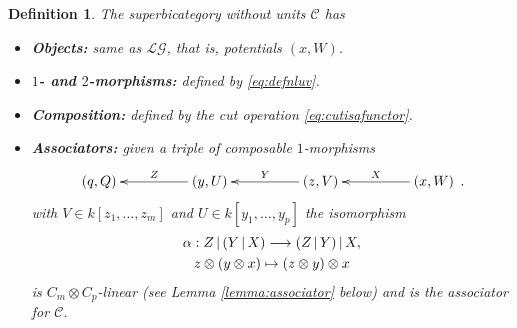 \documentclass[english,letter paper,12pt,leqno]{article}
\theoremstyle{example}
\newtheorem{definition}[theorem]{Definition}
\numberwithin{equation}{section}
\def\LG{\mathcal{LG}}
\def\L{\mathcal{C}}
\begin{document}
\begin{definition} The superbicategory without units $\L$ has
\begin{itemize}
\item \textbf{Objects:} same as $\LG$, that is, potentials $(x, W)$.
\item \textbf{$1$- and $2$-morphisms:} defined by \eqref{eq:defnluv}.
\item \textbf{Composition:} defined by the cut operation \eqref{eq:cutisafunctor}.
\item \textbf{Associators:} given a triple of composable $1$-morphisms
\begin{equation}\label{eq:composable_triple}
\xymatrix@C+2pc{
(q, Q) & (y, U) \ar[l]_-{Z} & (z,V) \ar[l]_-{Y} & (x,W) \ar[l]_-{X}
}\,.
\end{equation}
with $V \in k[z_1,\ldots,z_m]$ and $U \in k[y_1,\ldots,y_p]$ the isomorphism
\begin{gather*}
\alpha: Z \,|\, (Y \,|\, X) \longrightarrow (Z \,|\, Y) \,|\, X,\\
z \otimes (y \otimes x) \mapsto (z \otimes y) \otimes x
\end{gather*}
is $C_m \otimes C_p$-linear (see Lemma \ref{lemma:associator} below) and is the associator for $\L$.
\end{itemize}
\end{definition}
\end{document}
